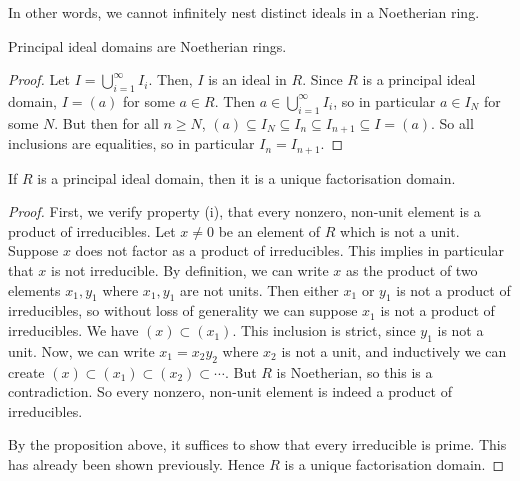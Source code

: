 In other words, we cannot infinitely nest distinct ideals in a Noetherian ring.
\begin{lemma}
	Principal ideal domains are Noetherian rings.
\end{lemma}
\begin{proof}
	Let $I = \bigcup_{i=1}^\infty I_i$.
	Then, $I$ is an ideal in $R$.
	Since $R$ is a principal ideal domain, $I = (a)$ for some $a \in R$.
	Then $a \in \bigcup_{i=1}^\infty I_i$, so in particular $a \in I_N$ for some $N$.
	But then for all $n \geq N$, $(a) \subseteq I_N \subseteq I_{n} \subseteq I_{n+1} \subseteq I = (a)$.
	So all inclusions are equalities, so in particular $I_n = I_{n+1}$.
\end{proof}
\begin{theorem}
	If $R$ is a principal ideal domain, then it is a unique factorisation domain.
\end{theorem}
\begin{proof}
	First, we verify property (i), that every nonzero, non-unit element is a product of irreducibles.
	Let $x \neq 0$ be an element of $R$ which is not a unit.
	Suppose $x$ does not factor as a product of irreducibles.
	This implies in particular that $x$ is not irreducible.
	By definition, we can write $x$ as the product of two elements $x_1, y_1$ where $x_1, y_1$ are not units.
	Then either $x_1$ or $y_1$ is not a product of irreducibles, so without loss of generality we can suppose $x_1$ is not a product of irreducibles.
	We have $(x) \subset (x_1)$.
	This inclusion is strict, since $y_1$ is not a unit.
	Now, we can write $x_1 = x_2 y_2$ where $x_2$ is not a unit, and inductively we can create $(x) \subset (x_1) \subset (x_2) \subset \cdots$.
	But $R$ is Noetherian, so this is a contradiction.
	So every nonzero, non-unit element is indeed a product of irreducibles.

	By the proposition above, it suffices to show that every irreducible is prime.
	This has already been shown previously.
	Hence $R$ is a unique factorisation domain.
\end{proof}
